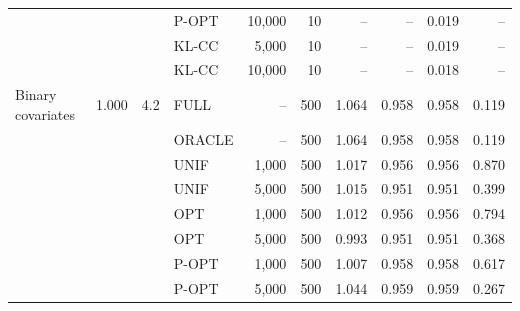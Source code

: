 \begin{tabular}{lrrlrrrrrr}
 &  &  & P-OPT & 10,000 & 10 & -- & -- & 0.019 & --\\
 &  &  & KL-CC & 5,000 & 10 & -- & -- & 0.019 & --\\
 &  &  & KL-CC & 10,000 & 10 & -- & -- & 0.018 & --\\
\addlinespace
Binary covariates & 1.000 & 4.2 & FULL & -- & 500 & 1.064 & 0.958 & 0.958 & 0.119\\
 &  &  & ORACLE & -- & 500 & 1.064 & 0.958 & 0.958 & 0.119\\
 &  &  & UNIF & 1,000 & 500 & 1.017 & 0.956 & 0.956 & 0.870\\
 &  &  & UNIF & 5,000 & 500 & 1.015 & 0.951 & 0.951 & 0.399\\
 &  &  & OPT & 1,000 & 500 & 1.012 & 0.956 & 0.956 & 0.794\\
 &  &  & OPT & 5,000 & 500 & 0.993 & 0.951 & 0.951 & 0.368\\
 &  &  & P-OPT & 1,000 & 500 & 1.007 & 0.958 & 0.958 & 0.617\\
 &  &  & P-OPT & 5,000 & 500 & 1.044 & 0.959 & 0.959 & 0.267\\
\bottomrule
\end{tabular}
